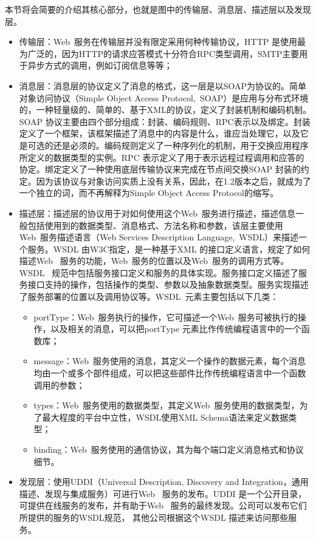 本节将会简要的介绍其核心部分，也就是图中的传输层、消息层、描述层以及发现层。
\begin{itemize}
  \item 传输层：Web~服务在传输层并没有限定采用何种传输协议，HTTP 是使用最为广泛的，因为HTTP的请求应答模式十分符合RPC类型调用，SMTP主要用于异步方式的调用，例如订阅信息等等；
  \item 消息层：消息层的协议定义了消息的格式，这一层是以SOAP为协议的。简单对象访问协议（Simple Object Access Protocol,~SOAP）是应用与分布式环境的，一种轻量级的、简单的、基于XML的协议，定义了封装机制和编码机制。SOAP 协议主要由四个部分组成：封装、编码规则、RPC表示以及绑定。封装定义了一个框架，该框架描述了消息中的内容是什么，谁应当处理它，以及它是可选的还是必须的。编码规则定义了一种序列化的机制，用于交换应用程序所定义的数据类型的实例。RPC 表示定义了用于表示远程过程调用和应答的协定。绑定定义了一种使用底层传输协议来完成在节点间交换SOAP 封装的约定。因为该协议与对象访问实质上没有关系，因此，在1.2版本之后，就成为了一个独立的词，而不再解释为Simple Object Access Protocol的缩写。
  \item 描述层：描述层的协议用于对如何使用这个Web~服务进行描述，描述信息一般包括使用到的数据类型、消息格式、方法名称和参数，该层主要使用Web~服务描述语言（Web Services Description Language,~WSDL）来描述一个服务。WSDL 由W3C指定，是一种基于XML 的接口定义语言，规定了如何描述Web~ 服务的功能，Web~服务的位置以及Web~服务的调用方式等。WSDL~ 规范中包括服务接口定义和服务的具体实现。服务接口定义描述了服务接口支持的操作，包括操作的类型、参数以及抽象数据类型。服务实现描述了服务部署的位置以及调用协议等。WSDL~元素主要包括以下几类：
      \begin{itemize}
        \item portType：Web~服务执行的操作，它可描述一个Web~服务可被执行的操作，以及相关的消息，可以把portType 元素比作传统编程语言中的一个函数库；
        \item message：Web~服务使用的消息，其定义一个操作的数据元素，每个消息均由一个或多个部件组成，可以把这些部件比作传统编程语言中一个函数调用的参数；
        \item types：Web~服务使用的数据类型，其定义Web~服务使用的数据类型，为了最大程度的平台中立性，WSDL使用XML Schema语法来定义数据类型；
        \item binding：Web~服务使用的通信协议，其为每个端口定义消息格式和协议细节。
      \end{itemize}
  \item 发现层：使用UDDI（Universal Description, Discovery and Integration，通用描述、发现与集成服务）可进行Web~ 服务的发布。UDDI 是一个公开目录，可提供在线服务的发布，并有助于Web~ 服务的最终发现。公司可以发布它们所提供的服务的WSDL规范， 其他公司根据这个WSDL 描述来访问那些服务。
\end{itemize}

